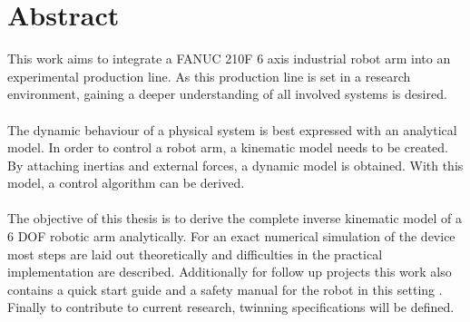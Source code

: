 \section{Abstract}


	This work aims to integrate a FANUC 210F 6 axis industrial robot arm  into an experimental production line. 
As this production line is set in a research environment, gaining a deeper understanding of all involved systems is desired.\\
\\
The dynamic behaviour of a physical system is best expressed with an analytical model.
In order to control a robot arm, a kinematic model needs to be created. By attaching inertias and external forces, a dynamic model is obtained. With this model, a control algorithm can be derived.\\
\\
The objective of this thesis is to derive the complete inverse kinematic model of a 6 \ac{DOF} robotic arm analytically. For an exact numerical simulation of the device most steps are laid out theoretically and difficulties in the practical implementation are described.
Additionally for follow up projects this work also contains a quick start guide and a safety manual for the robot in this setting .
Finally to contribute to current research, twinning specifications will be defined.\\


